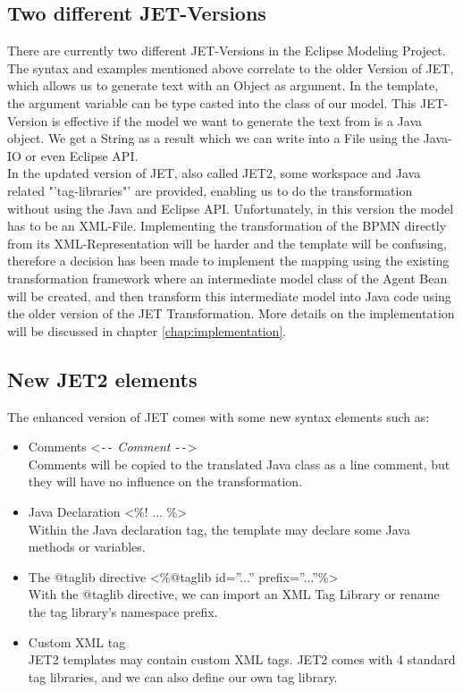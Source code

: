 \subsection{Two different JET-Versions}
There are currently two different JET-Versions in the Eclipse Modeling Project. The syntax and examples mentioned above correlate to the older Version of JET, which allows us to generate text with an Object as argument. In the template, the argument variable can be type casted into the class of our model. This JET-Version is effective if the model we want to generate the text from is a Java object. We get a String as a result which we can write into a File using the Java-IO or even Eclipse API.\\

In the updated version of JET, also called JET2, some workspace and Java related "'tag-libraries"' are provided, enabling us to do the transformation without using the Java and Eclipse API. Unfortunately, in this version the model has to be an XML-File.
Implementing the transformation of the BPMN directly from its XML-Representation will be harder and the template will be confusing, therefore a decision has been made to implement the mapping using the existing transformation framework where an intermediate model class of the Agent Bean will be created, and then transform this intermediate model into Java code using the older version of the JET Transformation.
More details on the implementation will be discussed in chapter \ref{chap:implementation}.

\subsection{New JET2 elements}
The enhanced version of JET comes with some new syntax elements such as:
\begin{itemize}
	\item Comments <\verb|--| \textit{Comment} \verb|--|>\\
	      Comments will be copied to the translated Java class as a line comment, but they will have no influence on the transformation.
	\item Java Declaration <\%! ... \%>\\
	      Within the Java declaration tag, the template may declare some Java methods or variables.
	\item The @taglib directive <\%@taglib id=''...'' prefix=''...''\%>\\
	      With the @taglib directive, we can import an XML Tag Library or rename the tag library's namespace prefix.
	\item Custom XML tag\\
	   		JET2 templates may contain custom XML tags. JET2 comes with 4 standard tag libraries, and we can also define our own tag library.				
\end{itemize}

